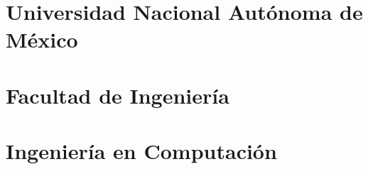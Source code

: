 \documentclass{beamer}
\newcommand{\UniversityName}{Universidad Nacional Aut\'{o}noma de M\'{e}xico}
\newcommand{\FacultyName}{Facultad de Ingenier\'{i}a}
\newcommand{\CollegeMajor}{Ingenier\'{i}a en Computaci\'{o}n}
\begin{document}

%

\section{\UniversityName}
\section{\FacultyName}
\section{\CollegeMajor}
\end{document}
